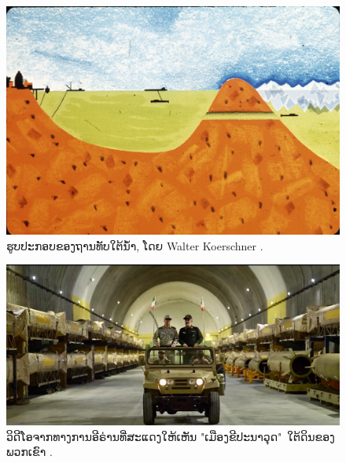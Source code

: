 \documentclass[10pt,twocolumn,letterpaper]{article}
\begin{document}
\begin{figure}[t]
\begin{center}
   \includegraphics[width=1\linewidth]{sub.jpg}
\end{center}
   \caption{ຮູບປະກອບຂອງຖານທັບໃຕ້ນ້ຳ, ໂດຍ Walter Koerschner \cite{22,23}.}
\label{fig:6}
\label{fig:onecol}
\end{figure}

\begin{figure}[t]
\begin{center}
   \includegraphics[width=1\linewidth]{iran.jpeg}
\end{center}
   \caption{ວິດີໂອຈາກທາງການອີຣ່ານທີ່ສະແດງໃຫ້ເຫັນ "ເມືອງຂີປະນາວຸດ" ໃຕ້ດິນຂອງພວກເຂົາ \cite{39,40}.}
\label{fig:12}
\label{fig:onecol}
\end{figure}
\end{document}
